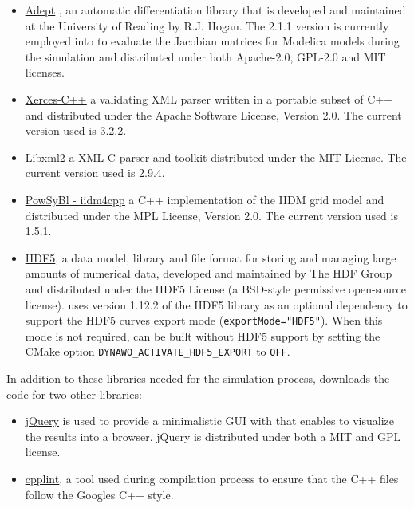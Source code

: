 \documentclass[a4paper, 12pt]{report}
\begin{document}
\begin{itemize}
\item \href{http://www.met.reading.ac.uk/clouds/adept/}{\underline{Adept}} \cite{hogan_robin_j_2017_1004730} \cite{Hogan:2014:FRA:2639949.2560359}, an automatic differentiation library that is developed and maintained at the University of Reading by R.J. Hogan. The 2.1.1 version is currently employed into \Dynawo to evaluate the Jacobian matrices for Modelica models during the simulation and distributed under both Apache-2.0, GPL-2.0 and MIT licenses.

\item \href{http://xerces.apache.org/xerces-c/}{\underline{Xerces-C++}} a validating XML parser written in a portable subset of C++ and distributed under the Apache Software License, Version 2.0. The current version used is 3.2.2.

\item \href{http://xmlsoft.org/}{\underline{Libxml2}} a XML C parser and toolkit distributed under the MIT License. The current version used is 2.9.4.

\item \href{https://www.powsybl.org/pages/documentation/developer/repositories/powsybl-iidm4cpp.html}{\underline{PowSyBl - iidm4cpp}} a C++ implementation of the IIDM grid model and distributed under the MPL License, Version 2.0. The current version used is 1.5.1.

\item \href{https://www.hdfgroup.org/solutions/hdf5/}{\underline{HDF5}}, a data model, library and file format for storing and managing large amounts of numerical data, developed and maintained by The HDF Group and distributed under the HDF5 License (a BSD-style permissive open-source license). \Dynawo uses version 1.12.2 of the HDF5 library as an optional dependency to support the HDF5 curves export mode (\texttt{exportMode="HDF5"}). When this mode is not required, \Dynawo can be built without HDF5 support by setting the CMake option \texttt{DYNAWO\_ACTIVATE\_HDF5\_EXPORT} to \texttt{OFF}.

\end{itemize}

In addition to these libraries needed for the simulation process, \Dynawo downloads the code for two other libraries:
\begin{itemize}
\item \href{https://jquery.com/}{\underline{jQuery}} is used to provide a minimalistic GUI with \Dynawo that enables to visualize the results into a browser. jQuery is distributed under both a MIT and GPL license.
\item \href{https://github.com/google/styleguide/tree/gh-pages/cpplint}{\underline{cpplint}}, a tool used during \Dynawo compilation process to ensure that the C++ files follow the Google\textquotesingle s C++ style.
\end{itemize}
\end{document}
